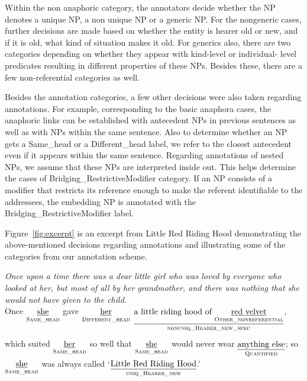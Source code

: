 \documentclass[11pt,letterpaper]{article}
\newcommand{\glosst}[2]{\ensuremath{\underset{\textrm{#2}}{\uline{\textrm{#1}}}}} %
\newcommand{\llbl}[1]{\mbox{\textsc{#1}}} %
\begin{document}
Within the non anaphoric category, the annotators decide whether the NP denotes a unique NP, a non unique NP or a generic NP. For the nongeneric cases, further decisions are made based on whether the entity is hearer old or new, and if it is old, what kind of situation makes it old. For generics also, there are two categories depending on whether they appear with kind-level or individual- level predicates resulting in different properties of these NPs. Besides these, there are a few non-referential categories as well.

Besides the annotation categories, a few other decisions were also taken regarding annotations. For example, corresponding to the basic anaphora cases, the anaphoric links can be established with antecedent NPs in previous sentences as well as with NPs within the same sentence. Also to determine whether an NP gets a Same\_head or a Different\_head label, we refer to the closest antecedent even if it appears within the same sentence. Regarding annotations of nested NPs, we assume that these NPs are interpreted inside out. This helps determine the cases of Bridging\_RestrictiveModifier category. If an NP consists of a modifier that restricts its reference enough to make the referent identifiable to the addressees, the embedding NP is annotated with the Bridging\_RestrictiveModifier label. 


Figure~\ref{fig:excerpt} is an excerpt from Little Red Riding Hood demonstrating the above-mentioned decisions regarding annotations and illustrating some of the categories from our annotation scheme.


\begin{figure*}[t]\small
\textit{Once upon a time there was a dear little girl who was loved by everyone who looked at her, but most of all by her grandmother, and there was nothing that she would not have given to the child.}
\\[5pt]
Once \glosst{she}{\llbl{Same\_head}} gave \glosst{her}{\llbl{Different\_head}} 
\glosst{a little riding hood of \glosst{red velvet}{\llbl{Other\_nonreferential}}}{$\underset{~}{\llbl{nonuniq\_Hearer\_new\_spec}}$}, 
which suited \glosst{her}{\llbl{Same\_head}} so well that \glosst{she}{\llbl{Same\_head}} 
would never wear \glosst{anything else}{\llbl{Quantified}}; so \glosst{she}{\llbl{Same\_head}} was always called 
`\glosst{Little Red Riding Hood}{\llbl{uniq\_Hearer\_new}}.'
\caption{An annotated sentence from ``Little Red Riding Hood.'' The previous sentence is shown for context.}
\label{fig:excerpt}
\end{figure*}
\end{document}
